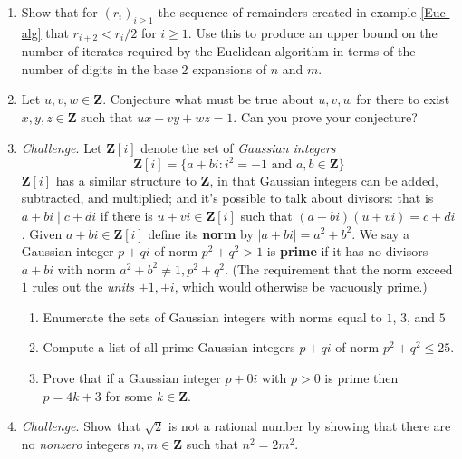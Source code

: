 \documentclass[12pt]{article}
\numberwithin{equation}{subsection}
\theoremstyle{note}
\begin{document}
\begin{enumerate}[label=\arabic*.]
	{\color{violet} Hint: If $p=ab$, then factor $2^{ab}-1=(2^a)^b-1$}
	
	\item \label{gcd-speed} Show that for $(r_i)_{i\geq 1}$ the sequence of remainders created in example \ref{Euc-alg} that $r_{i+2}< r_i/2$ for $i\geq 1$. Use this to produce an upper bound on the number of iterates required by the Euclidean algorithm in terms of the number of digits in the base 2 expansions of $n$ and $m$.
	
	\item Let $u,v,w\in\mathbf{Z}$. Conjecture what must be true about $u,v,w$ for there to exist $x,y,z\in\mathbf{Z}$ such that $ux+vy+wz=1$. Can you prove your conjecture?
	
	\item \textit{Challenge}. Let $\mathbf{Z}[i]$ denote the set of \textit{Gaussian integers} \[ \mathbf{Z}[i]=\{ a+bi : i^2=-1 \text{ and } a,b\in \mathbf{Z}\} \]
	$\mathbf{Z}[i]$ has a similar structure to $\mathbf{Z}$, in that Gaussian integers can be added, subtracted, and multiplied; and it's possible to talk about divisors: that is $a+bi \mid c+di$ if there is $u+vi\in\mathbf{Z}[i]$ such that $(a+bi)(u+vi)=c+di$. Given $a+bi\in\mathbf{Z}[i]$ define its \textbf{norm} by $|a+bi|=a^2+b^2$. We say a Gaussian integer $p+qi$ of norm $p^2+q^2>1$ is \textbf{prime} if it has no divisors $a+bi$ with norm $a^2+b^2\neq 1, p^2+q^2$. (The requirement that the norm exceed $1$ rules out the \textit{units} $\pm 1, \pm i$, which would otherwise be vacuously prime.) 
	
	 \begin{enumerate}
	 	\item Enumerate the sets of Gaussian integers with norms equal to $1$, $3$, and $5$
	 	\item Compute a list of all prime Gaussian integers $p+qi$ of norm $p^2+q^2 \leq 25$. 
		\item Prove that if a Gaussian integer $p+0i$ with $p>0$ is prime then $p=4k+3$ for some $k\in\mathbf{Z}$. 
	\end{enumerate}
	
	
	\item \textit{Challenge}. Show that $\sqrt{2}$ is not a rational number by showing that there are no \textit{nonzero} integers $n,m\in\mathbf{Z}$ such that $n^2=2m^2$. 
	

\end{enumerate}
\end{document}
